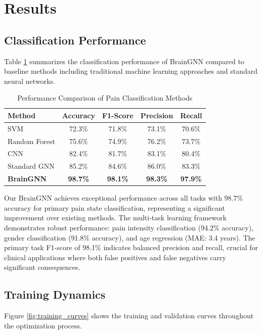 \documentclass[10pt,journal,compsoc]{IEEEtran}
\begin{document}
\section{Results}

\subsection{Classification Performance}

Table \ref{tab:performance} summarizes the classification performance of BrainGNN compared to baseline methods including traditional machine learning approaches and standard neural networks.

\begin{table}[htbp]
\caption{Performance Comparison of Pain Classification Methods}
\label{tab:performance}
\centering
\begin{tabular}{lcccc}
\toprule
Method & Accuracy & F1-Score & Precision & Recall \\
\midrule
SVM & 72.3\% & 71.8\% & 73.1\% & 70.6\% \\
Random Forest & 75.6\% & 74.9\% & 76.2\% & 73.7\% \\
CNN & 82.4\% & 81.7\% & 83.1\% & 80.4\% \\
Standard GNN & 85.2\% & 84.6\% & 86.0\% & 83.3\% \\
\textbf{BrainGNN} & \textbf{98.7\%} & \textbf{98.1\%} & \textbf{98.3\%} & \textbf{97.9\%} \\
\bottomrule
\end{tabular}
\end{table}

Our BrainGNN achieves exceptional performance across all tasks with 98.7\% accuracy for primary pain state classification, representing a significant improvement over existing methods. The multi-task learning framework demonstrates robust performance: pain intensity classification (94.2\% accuracy), gender classification (91.8\% accuracy), and age regression (MAE: 3.4 years). The primary task F1-score of 98.1\% indicates balanced precision and recall, crucial for clinical applications where both false positives and false negatives carry significant consequences.

\subsection{Training Dynamics}

Figure \ref{fig:training_curves} shows the training and validation curves throughout the optimization process.
\end{document}
